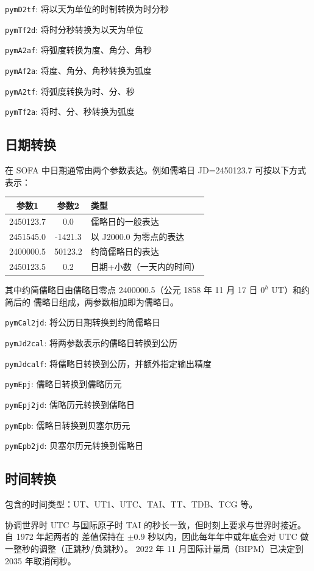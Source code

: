 \documentclass[11pt]{article}
\begin{document}
\texttt{pymD2tf}: 将以天为单位的时制转换为时分秒

\texttt{pymTf2d}: 将时分秒转换为以天为单位

\texttt{pymA2af}: 将弧度转换为度、角分、角秒

\texttt{pymAf2a}: 将度、角分、角秒转换为弧度

\texttt{pymA2tf}: 将弧度转换为时、分、秒

\texttt{pymTf2a}: 将时、分、秒转换为弧度

\subsection{日期转换}
在 SOFA 中日期通常由两个参数表达。例如儒略日 JD=2450123.7 可按以下方式表示：

\begin{table}[H]
\centering
\begin{tabular}{|c|c|l|}
\hline
参数1 & 参数2 & 类型 \\ \hline
2450123.7 & 0.0 & 儒略日的一般表达 \\ \hline
2451545.0 & -1421.3 & 以 J2000.0 为零点的表达 \\ \hline
2400000.5 & 50123.2 & 约简儒略日的表达 \\ \hline
2450123.5 & 0.2 & 日期+小数（一天内的时间） \\ \hline
\end{tabular}
\end{table}

其中约简儒略日由儒略日零点 2400000.5（公元 1858 年 11 月 17 日 $0^h$ UT）和约简后的
儒略日组成，两参数相加即为儒略日。

\texttt{pymCal2jd}: 将公历日期转换到约简儒略日

\texttt{pymJd2cal}: 将两参数表示的儒略日转换到公历

\texttt{pymJdcalf}: 将儒略日转换到公历，并额外指定输出精度

\texttt{pymEpj}: 儒略日转换到儒略历元

\texttt{pymEpj2jd}: 儒略历元转换到儒略日

\texttt{pymEpb}: 儒略日转换到贝塞尔历元

\texttt{pymEpb2jd}: 贝塞尔历元转换到儒略日

\subsection{时间转换}
包含的时间类型：UT、UT1、UTC、TAI、TT、TDB、TCG 等。

协调世界时 UTC 与国际原子时 TAI 的秒长一致，但时刻上要求与世界时接近。自 1972 年起两者的
差值保持在 $\pm0.9$ 秒以内，因此每年年中或年底会对 UTC 做一整秒的调整（正跳秒/负跳秒）。
2022 年 11 月国际计量局（BIPM）已决定到 2035 年取消闰秒。
\end{document}
